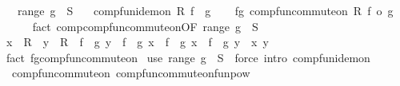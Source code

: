\begin{isabellebody}
\ \ \ {\isachardoublequoteopen}range\ g\ {\isasymsubseteq}\ S{\isachardoublequoteclose}\isanewline
\ \ \ {\isachardoublequoteopen}comp{\isacharunderscore}{\kern0pt}fun{\isacharunderscore}{\kern0pt}idem{\isacharunderscore}{\kern0pt}on\ R\ {\isacharparenleft}{\kern0pt}f\ {\isasymcirc}\ g{\isacharparenright}{\kern0pt}{\isachardoublequoteclose}\isanewline
%
\isadelimproof
%
\endisadelimproof
%
\isatagproof
{}\isamarkupfalse%
\isanewline
\ \ \isamarkupfalse%
\ f{\isacharunderscore}{\kern0pt}g{\isacharcolon}{\kern0pt}\ comp{\isacharunderscore}{\kern0pt}fun{\isacharunderscore}{\kern0pt}commute{\isacharunderscore}{\kern0pt}on\ R\ {\isachardoublequoteopen}f\ o\ g{\isachardoublequoteclose}\isanewline
\ \ \ \ \isamarkupfalse%
\ {\isacharparenleft}{\kern0pt}fact\ comp{\isacharunderscore}{\kern0pt}comp{\isacharunderscore}{\kern0pt}fun{\isacharunderscore}{\kern0pt}commute{\isacharunderscore}{\kern0pt}on{\isacharbrackleft}{\kern0pt}OF\ {\isacartoucheopen}range\ g\ {\isasymsubseteq}\ S{\isacartoucheclose}{\isacharbrackright}{\kern0pt}{\isacharparenright}{\kern0pt}\isanewline
\ \ \isamarkupfalse%
\ {\isachardoublequoteopen}x\ {\isasymin}\ R\ {\isasymLongrightarrow}\ y\ {\isasymin}\ R\ {\isasymLongrightarrow}\ {\isacharparenleft}{\kern0pt}f\ {\isasymcirc}\ g{\isacharparenright}{\kern0pt}\ y\ {\isasymcirc}\ {\isacharparenleft}{\kern0pt}f\ {\isasymcirc}\ g{\isacharparenright}{\kern0pt}\ x\ {\isacharequal}{\kern0pt}\ {\isacharparenleft}{\kern0pt}f\ {\isasymcirc}\ g{\isacharparenright}{\kern0pt}\ x\ {\isasymcirc}\ {\isacharparenleft}{\kern0pt}f\ {\isasymcirc}\ g{\isacharparenright}{\kern0pt}\ y{\isachardoublequoteclose}\ \ x\ y\isanewline
\ \ \ \ \isamarkupfalse%
\ {\isacharparenleft}{\kern0pt}fact\ f{\isacharunderscore}{\kern0pt}g{\isachardot}{\kern0pt}comp{\isacharunderscore}{\kern0pt}fun{\isacharunderscore}{\kern0pt}commute{\isacharunderscore}{\kern0pt}on{\isacharparenright}{\kern0pt}\isanewline
{}\isamarkupfalse%
\ {\isacharparenleft}{\kern0pt}use\ {\isacartoucheopen}range\ g\ {\isasymsubseteq}\ S{\isacartoucheclose}\ \ {\isacartoucheopen}force\ intro{\isacharcolon}{\kern0pt}\ comp{\isacharunderscore}{\kern0pt}fun{\isacharunderscore}{\kern0pt}idem{\isacharunderscore}{\kern0pt}on{\isacartoucheclose}{\isacharparenright}{\kern0pt}%
\endisatagproof
{\isafoldproof}%
%
\isadelimproof
\isanewline
%
\endisadelimproof
\isanewline
{}\isamarkupfalse%
\ {\isacharparenleft}{\kern0pt}\ comp{\isacharunderscore}{\kern0pt}fun{\isacharunderscore}{\kern0pt}commute{\isacharunderscore}{\kern0pt}on{\isacharparenright}{\kern0pt}\ comp{\isacharunderscore}{\kern0pt}fun{\isacharunderscore}{\kern0pt}commute{\isacharunderscore}{\kern0pt}on{\isacharunderscore}{\kern0pt}funpow{\isacharcolon}{\kern0pt}\isanewline

\end{isabellebody}
